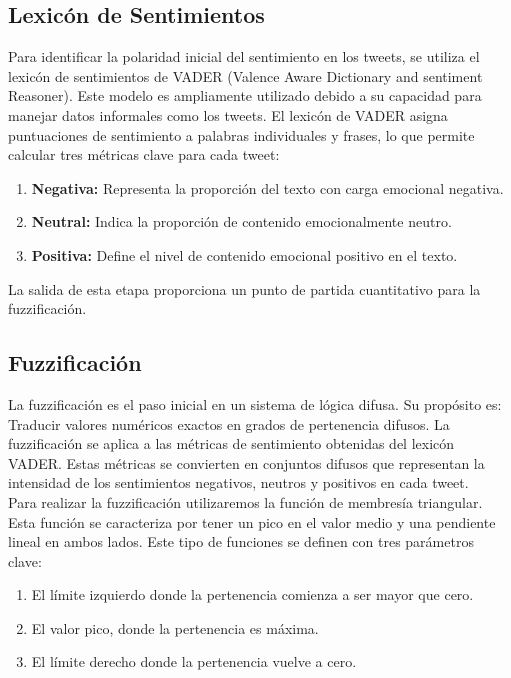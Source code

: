 \documentclass[sigconf, review=false, nonacm]{acmart}
\begin{document}
\subsection{Lexicón de Sentimientos}
Para identificar la polaridad inicial del sentimiento en los tweets,
se utiliza el lexicón de sentimientos de VADER (Valence Aware Dictionary and sentiment Reasoner).
Este modelo es ampliamente utilizado debido a su capacidad para manejar datos informales como los tweets.
El lexicón de VADER asigna puntuaciones de sentimiento a palabras individuales y frases, lo que permite calcular
tres métricas clave para cada tweet:

\begin{enumerate}
	\item \textbf{Negativa:} Representa la proporción del texto con carga emocional negativa.
	\item \textbf{Neutral:} Indica la proporción de contenido emocionalmente neutro.
	\item \textbf{Positiva:} Define el nivel de contenido emocional positivo en el texto.
\end{enumerate}

La salida de esta etapa proporciona un punto de partida cuantitativo para la fuzzificación.

\subsection{Fuzzificación}
La fuzzificación es el paso inicial en un sistema de lógica difusa.
Su propósito es: Traducir valores numéricos exactos en grados de pertenencia difusos.
La fuzzificación se aplica a las métricas de sentimiento obtenidas del lexicón VADER. Estas métricas se
convierten en conjuntos difusos que representan la intensidad de los sentimientos negativos, neutros y
positivos en cada tweet.\\

Para realizar la fuzzificación utilizaremos la función de membresía triangular. Esta
función se caracteriza por tener un pico en el valor medio y una pendiente lineal en ambos lados. Este tipo de
funciones se definen con tres parámetros clave:

\begin{enumerate}
	\item El límite izquierdo donde la pertenencia comienza a ser mayor que cero.
	\item El valor pico, donde la pertenencia es máxima.
	\item El límite derecho donde la pertenencia vuelve a cero.
\end{enumerate}
\end{document}
